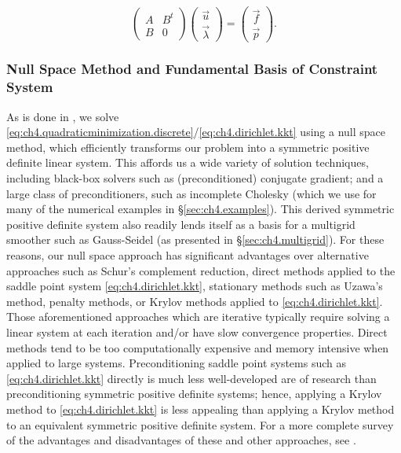 \begin{equation} \label{eq:ch4.dirichlet.kkt}
\begin{pmatrix} A & B^t \\ B & 0 \end{pmatrix} \begin{pmatrix} \vec{u} \\ \vec{\lambda} \end{pmatrix} = \begin{pmatrix} \vec{f} \\ \vec{p} \end{pmatrix}.
\end{equation}

\subsubsection{Null Space Method and Fundamental Basis of Constraint System} \label{subsubsec:ch4.nullspacemethod}

As is done in \cite{Bedrossian10}, we solve \eqref{eq:ch4.quadraticminimization.discrete}/\eqref{eq:ch4.dirichlet.kkt} using a null space method, which efficiently transforms our problem into a symmetric positive definite linear system. This affords us a wide variety of solution techniques, including black-box solvers such as (preconditioned) conjugate gradient; and a large class of preconditioners, such as incomplete Cholesky (which we use for many of the numerical examples in \S\ref{sec:ch4.examples}). This derived symmetric positive definite system also readily lends itself as a basis for a multigrid smoother such as Gauss-Seidel (as presented in \S\ref{sec:ch4.multigrid}). For these reasons, our null space approach has significant advantages over alternative approaches such as Schur's complement reduction, direct methods applied to the saddle point system \eqref{eq:ch4.dirichlet.kkt}, stationary methods such as Uzawa's method, penalty methods, or Krylov methods applied to \eqref{eq:ch4.dirichlet.kkt}. Those aforementioned approaches which are iterative typically require solving a linear system at each iteration and/or have slow convergence properties. Direct methods tend to be too computationally expensive and memory intensive when applied to large systems. Preconditioning saddle point systems such as \eqref{eq:ch4.dirichlet.kkt} directly is much less well-developed are of research than preconditioning symmetric positive definite systems; hence, applying a Krylov method to \eqref{eq:ch4.dirichlet.kkt} is less appealing than applying a Krylov method to an equivalent symmetric positive definite system. For a more complete survey of the advantages and disadvantages of these and other approaches, see \cite{Benzi05}.

